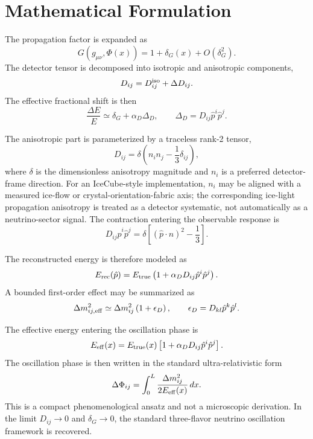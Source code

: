\documentclass[11pt]{article}
\begin{document}
\section{Mathematical Formulation}
The propagation factor is expanded as
\begin{equation}
 G(g_{\mu\nu},\Phi(x))=1+\delta_G(x)+O(\delta_G^2).
\end{equation}
The detector tensor is decomposed into isotropic and anisotropic components,
\begin{equation}
 D_{ij}=D^{\rm iso}_{ij}+\Delta D_{ij}.
\end{equation}
The effective fractional shift is then
\begin{equation}
 \frac{\Delta E}{E}\simeq \delta_G+\alpha_D\Delta_D,
 \qquad
 \Delta_D=D_{ij}\hat p^i\hat p^j.
\end{equation}

The anisotropic part is parameterized by a traceless rank-2 tensor,
\begin{equation}
 D_{ij}=\delta\left(n_i n_j-\frac{1}{3}\delta_{ij}\right),
\end{equation}
where $\delta$ is the dimensionless anisotropy magnitude and $n_i$ is a preferred detector-frame direction. For an IceCube-style implementation, $n_i$ may be aligned with a measured ice-flow or crystal-orientation-fabric axis; the corresponding ice-light propagation anisotropy is treated as a detector systematic, not automatically as a neutrino-sector signal.
The contraction entering the observable response is
\begin{equation}
 D_{ij}\hat p^i\hat p^j=
 \delta\left[(\hat p\cdot n)^2-\frac{1}{3}\right].
\end{equation}

The reconstructed energy is therefore modeled as
\begin{equation}
 E_{\rm rec}(\hat p)=E_{\rm true}\left(1+\alpha_D D_{ij}\hat p^i\hat p^j\right).
\end{equation}
A bounded first-order effect may be summarized as
\begin{equation}
 \Delta m_{ij,{\rm eff}}^2\simeq
 \Delta m_{ij}^2\left(1+\epsilon_D\right),
 \qquad
 \epsilon_D=D_{kl}\hat p^k\hat p^l .
\end{equation}

The effective energy entering the oscillation phase is
\begin{equation}
 E_{\rm eff}(x)=E_{\rm true}(x)
 \left[1+\alpha_D D_{ij}\hat p^i\hat p^j\right].
\end{equation}
The oscillation phase is then written in the standard ultra-relativistic form
\begin{equation}
 \Delta \Phi_{ij}=
 \int_0^L \frac{\Delta m_{ij}^2}{2E_{\rm eff}(x)}\,dx .
\end{equation}
This is a compact phenomenological ansatz and not a microscopic derivation.
In the limit $D_{ij}\to 0$ and $\delta_G\to 0$, the standard three-flavor neutrino oscillation framework is recovered.
\end{document}
